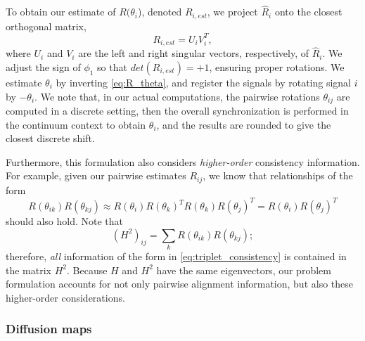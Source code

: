 \documentclass{pnastwo}
\begin{document}
\begin{article}
%
To obtain our estimate of $R(\theta_i$), denoted $R_{i, est}$, we project $\hat{R}_i$ onto the closest orthogonal matrix, 
\begin{equation} \label{eq:R_est}
R_{i, est} = U_i V_i^T,
\end{equation}
where $U_i$ and $V_i$ are the left and right singular vectors, respectively, of $\hat{R}_i$.
%
We adjust the sign of $\phi_1$ so that $det(R_{i, est}) = +1$, ensuring proper rotations.
%
We estimate $\theta_{i}$ by inverting \eqref{eq:R_theta}, and register the signals by rotating signal $i$ by $-\theta_i$.
%
We note that, in our actual computations, the pairwise rotations $\theta_{ij}$ are computed in a discrete setting, then the overall
synchronization is performed in the continuum context to obtain $\theta_i$, and the results are rounded to give the closest
discrete shift.

Furthermore, this formulation also considers {\it higher-order} consistency information.
%
For example, given our pairwise estimates $R_{ij}$, we know that relationships of the form
\begin{equation} \label{eq:triplet_consistency}
R(\theta_{ik}) R(\theta_{kj}) \approx R(\theta_i) R(\theta_k)^T R(\theta_k) R(\theta_j)^T = R(\theta_i) R(\theta_j)^T
\end{equation}
should also hold.
%
Note that
\begin{equation}
(H^2)_{ij} = \sum_k R(\theta_{ik}) R(\theta_{kj});
\end{equation}
therefore, {\it all} information of the form in \eqref{eq:triplet_consistency} is contained in the matrix $H^2$.
%
Because $H$ and $H^2$ have the same eigenvectors, our problem formulation accounts for not only pairwise alignment information, but also these higher-order considerations.

\subsubsection{Diffusion maps \cite{coifman2005geometric}}


\end{article}
\end{document}
